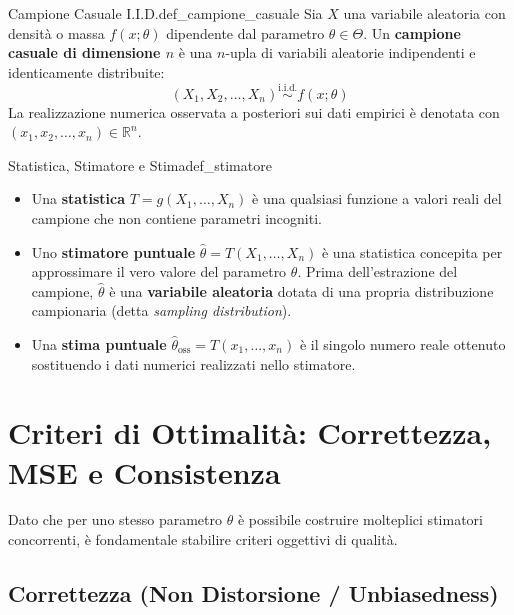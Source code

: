 \begin{definizione}{Campione Casuale I.I.D.}{def_campione_casuale}
Sia $X$ una variabile aleatoria con densità o massa $f(x; \theta)$ dipendente dal parametro $\theta \in \Theta$.
Un \textbf{campione casuale di dimensione $n$} è una $n$-upla di variabili aleatorie indipendenti e identicamente distribuite:
\begin{equation}
    (X_1, X_2, \dots, X_n) \stackrel{\text{i.i.d.}}{\sim} f(x; \theta)
\end{equation}
La realizzazione numerica osservata a posteriori sui dati empirici è denotata con $(x_1, x_2, \dots, x_n) \in \mathbb{R}^n$.
\end{definizione}

\begin{definizione}{Statistica, Stimatore e Stima}{def_stimatore}
\begin{itemize}
    \item Una \textbf{statistica} $T = g(X_1, \dots, X_n)$ è una qualsiasi funzione a valori reali del campione che non contiene parametri incogniti.
    \item Uno \textbf{stimatore puntuale} $\widehat{\theta} = T(X_1, \dots, X_n)$ è una statistica concepita per approssimare il vero valore del parametro $\theta$. Prima dell'estrazione del campione, $\widehat{\theta}$ è una \textbf{variabile aleatoria} dotata di una propria distribuzione campionaria (detta \emph{sampling distribution}).
    \item Una \textbf{stima puntuale} $\widehat{\theta}_{\text{oss}} = T(x_1, \dots, x_n)$ è il singolo numero reale ottenuto sostituendo i dati numerici realizzati nello stimatore.
\end{itemize}
\end{definizione}

\section{Criteri di Ottimalità: Correttezza, MSE e Consistenza}
\label{sec:ottimalita_stimatori}

Dato che per uno stesso parametro $\theta$ è possibile costruire molteplici stimatori concorrenti, è fondamentale stabilire criteri oggettivi di qualità.

\subsection{Correttezza (Non Distorsione / Unbiasedness)}

